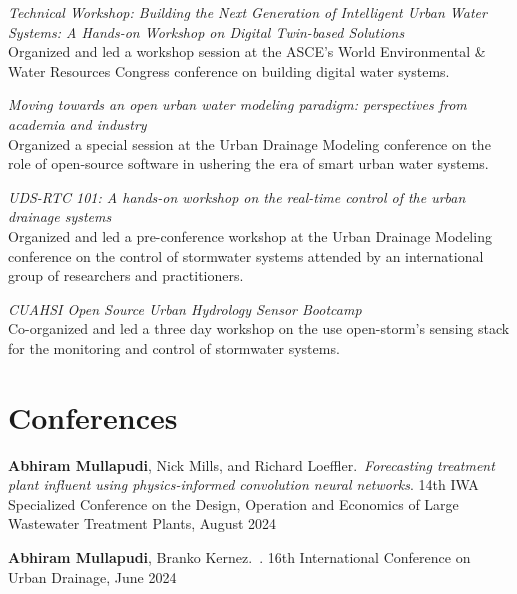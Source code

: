 \documentclass[a4paper,11pt]{article}
\newcommand{\years}[1]{%
  {\reversemarginpar\strut\marginnote{{\small#1}}}%
}
\begin{document}
\years{2023} \emph{Technical Workshop: Building the Next Generation of Intelligent Urban Water
Systems: A Hands-on Workshop on Digital Twin-based Solutions}\\[0.2cm]
Organized and led a workshop session at the ASCE’s World Environmental \& Water Resources Congress conference on building
digital water systems.\\[.1cm]

\years{2022} \emph{Moving towards an open urban water modeling paradigm: perspectives from academia and industry}\\[.2cm]
Organized a special session at the Urban Drainage Modeling conference on the
role of open-source software in ushering the era of smart urban water systems.\\[.1cm]

\years{2022} \emph{UDS-RTC 101: A hands-on workshop on the real-time control of the urban drainage systems}\\[.2cm]
Organized and led a pre-conference workshop at the Urban Drainage Modeling
conference on the control of stormwater systems attended by an international
group of researchers and practitioners.\\[.1cm]

\years{2017, 2019} \emph{CUAHSI Open Source Urban Hydrology Sensor Bootcamp}\\[.2cm]
Co-organized and led a three day workshop on the use open-storm’s sensing stack
for the monitoring and control of stormwater systems.

\section*{Conferences}

\years{2024} \textbf{Abhiram Mullapudi}, Nick Mills, and Richard Loeffler.\ \emph{Forecasting treatment plant influent using physics-informed convolution neural networks}. 14th IWA Specialized Conference on the Design, Operation and Economics of Large Wastewater Treatment Plants, August 2024\\[.1cm]

\years{2024} \textbf{Abhiram Mullapudi}, Branko Kernez.\ . 16th International Conference on Urban Drainage, June 2024\\[.1cm]
\end{document}
